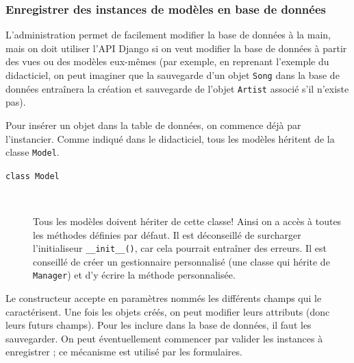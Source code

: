 \documentclass[a4paper, 10pt]{article}
\begin{document}
\subsubsection{Enregistrer des instances de modèles en base de données}
L'administration  permet de facilement modifier la base de données à la main, mais on doit utiliser l'API Django si on veut modifier la base de données à partir des vues ou des modèles eux-mêmes (par exemple, en reprenant l'exemple du didacticiel, on peut imaginer que la sauvegarde d'un objet \texttt{Song} dans la base de données entraînera la création et sauvegarde de l'objet \texttt{Artist} associé s'il n'existe pas).\medskip

Pour insérer un objet dans la table de données, on commence déjà par l'instancier. Comme indiqué dans le didacticiel, tous les modèles héritent de la classe \texttt{Model}.

\begin{description}
    \item[\texttt{class Model}]~

            Tous les modèles doivent hériter de cette classe! Ainsi on a accès à toutes les méthodes définies par défaut. Il est déconseillé de surcharger l'initialiseur \texttt{__init__()}, car cela pourrait entraîner des erreurs. Il est conseillé de créer un gestionnaire personnalisé (une classe qui hérite de \texttt{Manager}) et d'y écrire la méthode personnalisée.
\end{description}

Le constructeur accepte en paramètres nommés les différents champs qui le caractérisent. Une fois les objets créés, on peut modifier leurs attributs (donc leurs futurs champs). Pour les inclure dans la base de données, il faut les sauvegarder. On peut éventuellement commencer par valider les instances à enregistrer ; ce mécanisme est utilisé par les formulaires.
\end{document}
